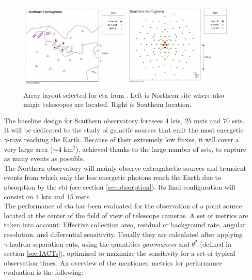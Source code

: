 \documentclass[main.tex]{subfiles}
\begin{document}
\begin{figure}[h]
  \centering
  \includegraphics[width=1\textwidth]{Pictures/Array-Layouts.pdf}
  \caption{Array layout selected for \gls{cta} from \cite{CTAPerformance}. Left is Northern site where also \gls{magic} telescopes are located. Right is Southern location.}
  \label{fig:arraylayout}
\end{figure}

The baseline design for Southern observatory foresees 4 \glspl{lst}, 25 \glspl{mst} and 70 \glspl{sst}. It will be dedicated to the study of galactic sources that emit the most energetic $\gamma$-rays reaching the Earth. Because of their extremely low fluxes, it will cover a very large area ($\sim4$ km$^2$), achieved thanks to the large number of \glspl{sst}, to capture as many events as possible.\\
The Northern observatory will mainly observe extragalactic sources and transient events from which only the less energetic photons reach the Earth due to absorption by the \gls{ebl} (see section \ref{sec:absorption}). Its final configuration will consist on 4 \glspl{lst} and 15 \glspl{mst}.\\
The performance of \gls{cta} has been evaluated for the observation of a point source located at the center of the field of view of telescope cameras. A set of metrics are taken into account: Effective collection area, residual \gls{cr} background rate, angular resolution, and differential sensitivity. Usually they are calculated after applying $\gamma$-hadron separation cuts, using the quantities \textit{gammaness} and $\theta^2$ (defined in section \ref{sec:IACTs}), optimized to maximize the sensitivity for a set of typical observation times.
An overview of the mentioned metrics for performance evaluation is the following:\\
\end{document}
